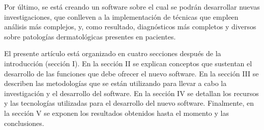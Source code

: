 \documentclass[conference]{IEEEtran}
\begin{document}
Por \'{u}ltimo, se est\'{a} creando un software sobre el cual se podr\'{a}n desarrollar nuevas investigaciones, que conlleven a la implementaci\'{o}n de t\'{e}cnicas que empleen an\'{a}lisis m\'{a}s complejos, y, como resultado, diagn\'{o}sticos m\'{a}s completos y diversos sobre patolog\'{i}as dermatol\'{o}gicas presentes en pacientes.

El presente art\'{i}culo est\'{a} organizado en cuatro secciones despu\'{e}s de la introducci\'{o}n (secci\'{o}n I). En la secci\'{o}n II se explican conceptos que sustentan el desarrollo de las funciones que debe ofrecer el nuevo software. En la secci\'{o}n III se describen las metodolog\'{i}as que se est\'{a}n utilizando para llevar a cabo la investigaci\'{o}n y el desarrollo del software. En la secci\'{o}n IV se detallan los recursos y las tecnolog\'{i}as utilizadas para el desarrollo del nuevo software. Finalmente, en la secci\'{o}n V se exponen los resultados obtenidos hasta el momento y las conclusiones.


%
%

\end{document}
